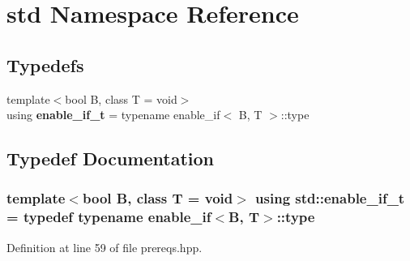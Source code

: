 \section{std Namespace Reference}
\label{namespacestd}
\subsection*{Typedefs}
\begin{DoxyCompactItemize}
\item 
{\footnotesize template$<$bool B, class T  = void$>$ }\\using {\bf enable\+\_\+if\+\_\+t} = typename enable\+\_\+if$<$ B, T $>$\+::type
\end{DoxyCompactItemize}


\subsection{Typedef Documentation}
\subsubsection[{enable\+\_\+if\+\_\+t}]{\setlength{\rightskip}{0pt plus 5cm}template$<$bool B, class T  = void$>$ using {\bf std\+::enable\+\_\+if\+\_\+t} = typedef typename enable\+\_\+if$<$B, T$>$\+::type}\label{namespacestd_ac774dbdf8ae769197167b2a8273462fc}


Definition at line 59 of file prereqs.\+hpp.

